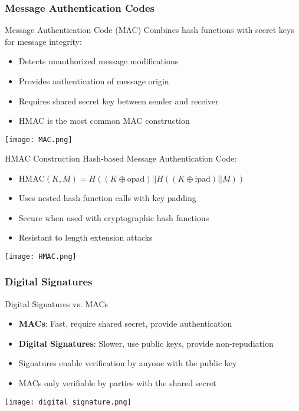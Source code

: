 \subsubsection{Message Authentication Codes}

\begin{definition}{Message Authentication Code (MAC)}
    Combines hash functions with secret keys for message integrity:
    \begin{itemize}
        \item Detects unauthorized message modifications
        \item Provides authentication of message origin
        \item Requires shared secret key between sender and receiver
        \item HMAC is the most common MAC construction
    \end{itemize}
    \texttt{[image: MAC.png]}
\end{definition}

\begin{concept}{HMAC Construction}
    Hash-based Message Authentication Code:
    \begin{itemize}
        \item $\text{HMAC}(K, M) = H((K \oplus \text{opad}) || H((K \oplus \text{ipad}) || M))$
        \item Uses nested hash function calls with key padding
        \item Secure when used with cryptographic hash functions
        \item Resistant to length extension attacks
    \end{itemize}
    \texttt{[image: HMAC.png]}
\end{concept}

\subsubsection{Digital Signatures}

\begin{concept}{Digital Signatures vs. MACs}
    \begin{itemize}
        \item \textbf{MACs}: Fast, require shared secret, provide authentication
        \item \textbf{Digital Signatures}: Slower, use public keys, provide non-repudiation
        \item Signatures enable verification by anyone with the public key
        \item MACs only verifiable by parties with the shared secret
    \end{itemize}
    \texttt{[image: digital\_signature.png]}
\end{concept}

